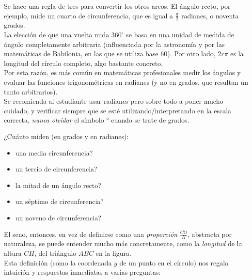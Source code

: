 Se hace una regla de tres para convertir los otros arcos. El ángulo recto, por ejemplo, mide un cuarto de circunferencia, que es igual a $\frac{\pi}{2}$ radianes, o noventa grados. \\

La elección de que una vuelta mida $360^{\circ}$ se basa en una unidad de medida de ángulo completamente arbitraria (influenciada por la astronomía y por las matemáticas de Babilonia, en las que se utiliza base $60$). Por otro lado, $2r\pi $ es la longitud del círculo completo, algo bastante concreto. \\

Por esta razón, es más común en matemáticas profesionales medir los ángulos y evaluar las funciones trigonométricas en radianes (y no en grados, que resultan un tanto arbitrarios).\\ 

Se recomienda al estudiante usar radianes pero sobre todo a poner mucho cuidado, y verificar siempre que se esté utilizando/interpretando en la escala correcta, \emph{nunca olvidar} el símbolo ° cuando se trate de grados.\\ 

\begin{ejercicio}
¿Cuánto miden (en grados y en radianes):
\begin{itemize} 
\item una media circunferencia? 
\item un tercio de circunferencia? 
\item la mitad de un ángulo recto? 
\item un séptimo de circunferencia? 
\item un noveno de circunferencia?
\end{itemize}
 \end{ejercicio}

El seno, entonces, en vez de definirse como una \emph{proporción} $\frac{CO}{H}$, abstracta por naturaleza, se puede entender mucho más concretamente, como la \emph{longitud} de la altura $CH$, del triángulo $ABC$ en la figura.\\

Esta definición (como la coordenada $y$ de un punto en el círculo) nos regala intuición y respuestas inmediatas a varias preguntas: \\


